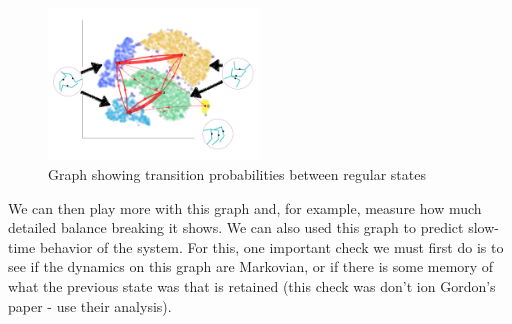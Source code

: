 \documentclass[reprint,prx]{revtex4-1}
\renewcommand{\=}[1]{\stackrel{#1}{=}} %
\renewcommand{\(}{\left (}
\renewcommand{\)}{\right  )}
\renewcommand{\[}{\left [}
\renewcommand{\]}{\right ]}
\newcommand{\<}{\left <}
\renewcommand{\>}{\right >}
\theoremstyle{definition}
\theoremstyle{remark}
\begin{document}
\begin{figure}
\includegraphics[width=0.5\textwidth]{transGraph.png}
\caption{Graph showing transition probabilities between regular states \label{fig:transGraph}}
\end{figure}

We can then play more with this graph and, for example, measure how much detailed balance breaking it shows. We can also used this graph to predict slow-time behavior of the system. For this, one important check we must first do is to see if the dynamics on this graph are Markovian, or if there is some memory of what the previous state was that is retained (this check was don't ion Gordon's paper - use their analysis).



\end{document}
